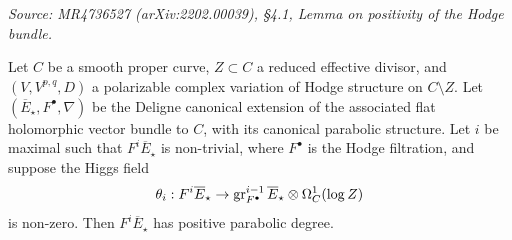 \begin{lemma}
  \label{lem:positive-Hodge-bundle}
  \textit{Source: MR4736527 (arXiv:2202.00039), §4.1, Lemma on positivity of the
  Hodge bundle.}

  Let \(C\) be a smooth proper curve, \(Z \subset C\) a reduced effective divisor,
  and \((V, V^{p,q}, D)\) a polarizable complex variation of Hodge structure on
  \(C \setminus Z\). Let \((\overline{E}_\star, F^\bullet, \nabla)\) be the Deligne
  canonical extension of the associated flat holomorphic vector bundle to \(C\),
  with its canonical parabolic structure. Let \(i\) be maximal such that
  \(F^i \overline{E}_\star\) is non-trivial, where \(F^\bullet\) is the Hodge
  filtration, and suppose the Higgs field
  \[
    \theta_i : F^i \overline{E}_\star \to
    \operatorname{gr}^{i-1}_{F^\bullet} \overline{E}_\star \otimes \Omega^1_C(\log Z)
  \]
  is non-zero. Then \(F^i \overline{E}_\star\) has positive parabolic degree.
\end{lemma}

